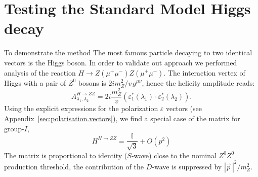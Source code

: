 \documentclass[prd,preprintnumbers,floatfix,
nofootinbib,superscriptaddress]{revtex4}
\newcommand{\I}{\ensuremath{I}}
\begin{document}
\section{Testing the Standard Model Higgs decay} \label{sec:higgs}
To demonstrate the method
The most famous particle decaying to two identical vectors is the Higgs boson.
In order to validate out approach we performed analysis of the reaction $H\to Z(\mu^+\mu^-)Z(\mu^+\mu^-)$.
The interaction vertex of Higgs with a pair of $Z^0$ bosons is $2i m_Z^2/v\,g^{\mu\nu}$,
hence the helicity amplitude reads:
\begin{equation} \label{eq:HZZ}
  A^{H\to ZZ}_{\lambda_1,\lambda_2} = 2i\frac{m_Z^2}{v} (\varepsilon_1^*(\lambda_1)\cdot\varepsilon_2^*(\lambda_2)).
\end{equation}
Using the explicit expressions for the polarization $\varepsilon$ vectors (see Appendix~\ref{sec:polarisation.vectors}), we find a special case of the matrix for group-$\I$,
\begin{equation} \label{eq:H2ZZ}
  H^{H\to ZZ} = \frac{\mathbb{I}}{\sqrt{3}} + O(p^2)
\end{equation}
The matrix is proportional to identity ($S$-wave) close to the nominal $Z^0Z^0$ production threshold,
the contribution of the $D$-wave is suppressed by $|\vec p\,|^2/m_Z^2$.
\end{document}

